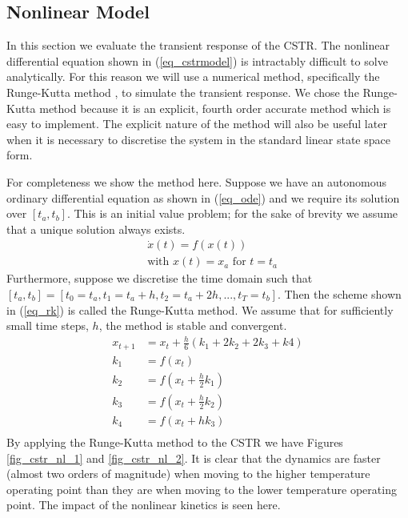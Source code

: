 \subsection{Nonlinear Model}
In this section we evaluate the transient response of the CSTR. The nonlinear differential equation shown in (\ref{eq_cstrmodel}) is intractably difficult to solve analytically. For this reason we will use a numerical method, specifically the Runge-Kutta method \cite{edwardsandpenny}, to simulate the transient response. We chose the Runge-Kutta method because it is an explicit, fourth order accurate method which is easy to implement. The explicit nature of the method will also be useful later when it is necessary to discretise the system in the standard linear state space form.

For completeness we show the method here. Suppose we have an autonomous ordinary differential equation as shown in (\ref{eq_ode}) and we require its solution over $[t_a, t_b]$. This is an initial value problem; for the sake of brevity we assume that a unique solution always exists.
\begin{equation}
\begin{aligned}
&\dot{x}(t) = f(x(t)) \\
&\text{with } x(t) = x_a \text{ for } t=t_a
\end{aligned}
\label{eq_ode}
\end{equation}
Furthermore, suppose we discretise the time domain such that $[t_a, t_b] = [t_0=t_a, t_1= t_a+ h, t_2=t_a+ 2h,...,t_T = t_b]$. Then the scheme shown in (\ref{eq_rk}) is called the Runge-Kutta method. We assume that for sufficiently small time steps, $h$, the method is stable and convergent.
\begin{equation}
\begin{aligned}
x_{t+1} &= x_{t} + \frac{h}{6}\left(k_1 + 2k_2 + 2k_3 +k4\right) \\
k_1 &= f(x_t) \\
k_2 &= f(x_t + \frac{h}{2}k_1) \\
k_3 &= f(x_t+ \frac{h}{2}k_2) \\
k_4 &= f(x_t+ hk_3) \\
\end{aligned}
\label{eq_rk}
\end{equation}  
By applying the Runge-Kutta method to the CSTR we have Figures \ref{fig_cstr_nl_1} and \ref{fig_cstr_nl_2}. It is clear that the dynamics are faster (almost two orders of magnitude) when moving to the higher temperature operating point than they are when moving to the lower temperature operating point. The impact of the nonlinear kinetics is seen here. 
